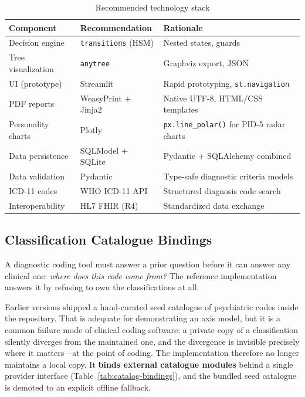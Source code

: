 \documentclass[11pt,a4paper]{article}
\begin{document}
\begin{table}[H]
\centering
\caption{Recommended technology stack}
\label{tab:techstack}
\begin{tabularx}{\textwidth}{lXl}
\toprule
\textbf{Component} & \textbf{Recommendation} & \textbf{Rationale} \\
\midrule
Decision engine & \texttt{transitions} (HSM) & Nested states, guards \\
Tree visualization & \texttt{anytree} & Graphviz export, JSON \\
UI (prototype) & Streamlit & Rapid prototyping, \texttt{st.navigation} \\
PDF reports & WeasyPrint + Jinja2 & Native UTF-8, HTML/CSS templates \\
Personality charts & Plotly & \texttt{px.line\_polar()} for PID-5 radar charts \\
Data persistence & SQLModel + SQLite & Pydantic + SQLAlchemy combined \\
Data validation & Pydantic & Type-safe diagnostic criteria models \\
ICD-11 codes & WHO ICD-11 API & Structured diagnosis code search \\
Interoperability & HL7 FHIR (R4) & Standardized data exchange \\
\bottomrule
\end{tabularx}
\end{table}

\subsection{Classification Catalogue Bindings}
\label{sec:catalog-bindings}

A diagnostic coding tool must answer a prior question before it can answer any clinical one: \emph{where does this code come from?} The reference implementation answers it by refusing to own the classifications at all.

Earlier versions shipped a hand-curated seed catalogue of psychiatric codes inside the repository. That is adequate for demonstrating an axis model, but it is a common failure mode of clinical coding software: a private copy of a classification silently diverges from the maintained one, and the divergence is invisible precisely where it matters---at the point of coding. The implementation therefore no longer maintains a local copy. It \textbf{binds external catalogue modules} behind a single provider interface (Table~\ref{tab:catalog-bindings}), and the bundled seed catalogue is demoted to an explicit offline fallback.
\end{document}

